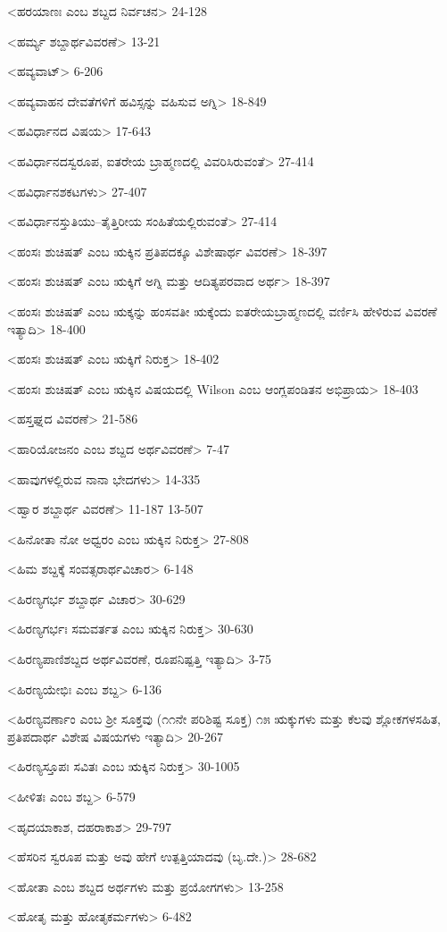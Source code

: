 <ಹರಯಾಣಃ ಎಂಬ ಶಬ್ದದ ನಿರ್ವಚನ>
24-128

<ಹರ್ಮ್ಯ ಶಬ್ದಾರ್ಥವಿವರಣೆ>
13-21

<ಹವ್ಯವಾಟ್‍>
6-206

<ಹವ್ಯವಾಹನ ದೇವತೆಗಳಿಗೆ ಹವಿಸ್ಸನ್ನು ವಹಿಸುವ ಅಗ್ನಿ>
18-849

<ಹವಿರ್ಧಾನದ ವಿಷಯ>
17-643

<ಹವಿರ್ಧಾನದಸ್ವರೂಪ, ಐತರೇಯ ಬ್ರಾಹ್ಮಣದಲ್ಲಿ ವಿವರಿಸಿರುವಂತೆ>
27-414

<ಹವಿರ್ಧಾನಶಕಟಗಳು>
27-407

<ಹವಿರ್ಧಾನಸ್ತುತಿಯು–ತೈತ್ತಿರೀಯ ಸಂಹಿತೆಯಲ್ಲಿರುವಂತೆ>
27-414

<ಹಂಸಃ ಶುಚಿಷತ್‍ ಎಂಬ ಋಕ್ಕಿನ ಪ್ರತಿಪದಕ್ಕೂ ವಿಶೇಷಾರ್ಥ ವಿವರಣೆ>
18-397

<ಹಂಸಃ ಶುಚಿಷತ್‍ ಎಂಬ ಋಕ್ಕಿಗೆ ಅಗ್ನಿ ಮತ್ತು ಆದಿತ್ಯಪರವಾದ ಅರ್ಥ>
18-397

<ಹಂಸಃ ಶುಚಿಷತ್‍ ಎಂಬ ಋಕ್ಕನ್ನು ಹಂಸವತೀ ಋಕ್ಕೆಂದು ಐತರೇಯಬ್ರಾಹ್ಮಣದಲ್ಲಿ ವರ್ಣಿಸಿ ಹೇಳಿರುವ ವಿವರಣೆ ಇತ್ಯಾದಿ>
18-400

<ಹಂಸಃ ಶುಚಿಷತ್‍ ಎಂಬ ಋಕ್ಕಿಗೆ ನಿರುಕ್ತ>
18-402

<ಹಂಸಃ ಶುಚಿಷತ್‍ ಎಂಬ ಋಕ್ಕಿನ ವಿಷಯದಲ್ಲಿ Wilson ಎಂಬ ಆಂಗ್ಲಪಂಡಿತನ ಅಭಿಪ್ರಾಯ>
18-403

<ಹಸ್ತಘ್ನದ ವಿವರಣೆ>
21-586

<ಹಾರಿಯೋಜನಂ ಎಂಬ ಶಬ್ದದ ಅರ್ಥವಿವರಣೆ>
7-47

<ಹಾವುಗಳಲ್ಲಿರುವ ನಾನಾ ಭೇದಗಳು>
14-335

<ಹ್ವಾರ ಶಬ್ದಾರ್ಥ ವಿವರಣೆ>
11-187
13-507

<ಹಿನೋತಾ ನೋ ಅಧ್ವರಂ ಎಂಬ ಋಕ್ಕಿನ ನಿರುಕ್ತ>
27-808

<ಹಿಮ ಶಬ್ದಕ್ಕೆ ಸಂವತ್ಸರಾರ್ಥವಿಚಾರ>
6-148

<ಹಿರಣ್ಯಗರ್ಭ ಶಬ್ದಾರ್ಥ ವಿಚಾರ>
30-629

<ಹಿರಣ್ಯಗರ್ಭಃ ಸಮವರ್ತತ ಎಂಬ ಋಕ್ಕಿನ ನಿರುಕ್ತ>
30-630

<ಹಿರಣ್ಯಪಾಣಿಶಬ್ದದ ಅರ್ಥವಿವರಣೆ, ರೂಪನಿಷ್ಪತ್ತಿ ಇತ್ಯಾದಿ>
3-75

<ಹಿರಣ್ಯಯೇಭಿಃ ಎಂಬ ಶಬ್ದ>
6-136

<ಹಿರಣ್ಯವರ್ಣಾಂ ಎಂಬ ಶ್ರೀ ಸೂಕ್ತವು (೧೧ನೇ ಪರಿಶಿಷ್ಟ ಸೂಕ್ತ) ೧೫ ಋಕ್ಕುಗಳು ಮತ್ತು ಕೆಲವು ಶ್ಲೋಕಗಳಸಹಿತ, ಪ್ರತಿಪದಾರ್ಥ ವಿಶೇಷ ವಿಷಯಗಳು ಇತ್ಯಾದಿ>
20-267

<ಹಿರಣ್ಯಸ್ತೂಪಃ ಸವಿತಃ ಎಂಬ ಋಕ್ಕಿನ ನಿರುಕ್ತ>
30-1005

<ಹೀಳಿತಃ ಎಂಬ ಶಬ್ದ>
6-579

<ಹೃದಯಾಕಾಶ, ದಹರಾಕಾಶ>
29-797

<ಹೆಸರಿನ ಸ್ವರೂಪ ಮತ್ತು ಅವು ಹೇಗೆ ಉತ್ಪತ್ತಿಯಾದವು (ಬೃ.ದೇ.)>
28-682

<ಹೋತಾ ಎಂಬ ಶಬ್ದದ ಅರ್ಥಗಳು ಮತ್ತು ಪ್ರಯೋಗಗಳು>
13-258

<ಹೋತೃ ಮತ್ತು ಹೋತೃಕರ್ಮಗಳು>
6-482

